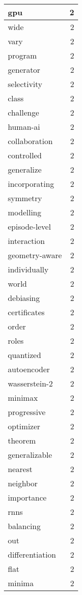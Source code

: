 \begin{table}[h]
\begin{tabular}{|l|r|}
\hline
gpu & 2 \\
\hline
wide & 2 \\
\hline
vary & 2 \\
\hline
program & 2 \\
\hline
generator & 2 \\
\hline
selectivity & 2 \\
\hline
class & 2 \\
\hline
challenge & 2 \\
\hline
human-ai & 2 \\
\hline
collaboration & 2 \\
\hline
controlled & 2 \\
\hline
generalize & 2 \\
\hline
incorporating & 2 \\
\hline
symmetry & 2 \\
\hline
modelling & 2 \\
\hline
episode-level & 2 \\
\hline
interaction & 2 \\
\hline
geometry-aware & 2 \\
\hline
individually & 2 \\
\hline
world & 2 \\
\hline
debiasing & 2 \\
\hline
certificates & 2 \\
\hline
order & 2 \\
\hline
roles & 2 \\
\hline
quantized & 2 \\
\hline
autoencoder & 2 \\
\hline
wasserstein-2 & 2 \\
\hline
minimax & 2 \\
\hline
progressive & 2 \\
\hline
optimizer & 2 \\
\hline
theorem & 2 \\
\hline
generalizable & 2 \\
\hline
nearest & 2 \\
\hline
neighbor & 2 \\
\hline
importance & 2 \\
\hline
rnns & 2 \\
\hline
balancing & 2 \\
\hline
out & 2 \\
\hline
differentiation & 2 \\
\hline
flat & 2 \\
\hline
minima & 2 \\

\end{tabular}
\end{table}
